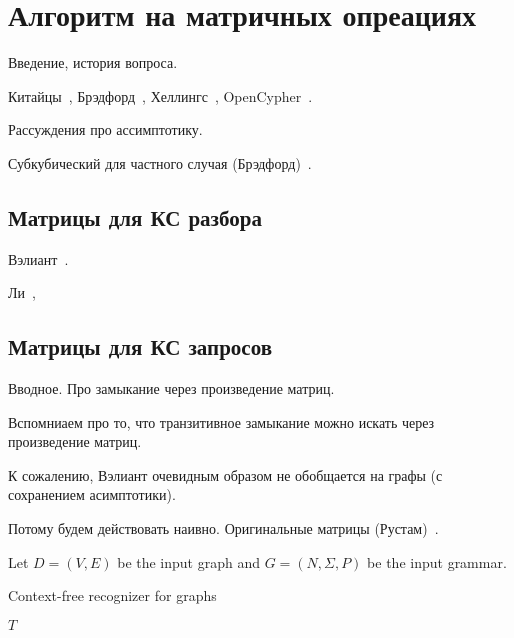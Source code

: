 \section{Алгоритм на матричных опреациях}

Введение, история вопроса.

Китайцы~\cite{10.1007/978-3-319-46523-4_38}, Брэдфорд~\cite{bradford2007quickest,ward2008distributed,bradford2016fast,Bradford:2008:LCG:1373936.1373946}, Хеллингс~\cite{hellingsRelational,hellings2015querying,Hellings2015PathRF}, OpenCypher~\cite{Kuijpers:2019:ESC:3335783.3335791}.

Рассуждения про ассимптотику.

Субкубический для частного случая (Брэдфорд)~\cite{8249039}.

\subsection{Матрицы для КС разбора}

Вэлиант~\cite{Valiant:1975:GCR:1739932.1740048}.

Ли~\cite{Lee:2002:FCG:505241.505242},


\subsection{Матрицы для КС запросов}
Вводное.
Про замыкание через произведение матриц.

Вспомниаем про то, что транзитивное замыкание можно искать через произведение матриц.


К сожалению, Вэлиант очевидным образом не обобщается на графы (с сохранением асимптотики).


Потому будем действовать наивно.
Оригинальные матрицы (Рустам)~\cite{Azimov:2018:CPQ:3210259.3210264}.

Let $D = (V, E)$ be the input graph and $G = (N,\Sigma,P)$ be the input grammar.

\begin{algorithm}[H]
\begin{algorithmic}[1]
\caption{Context-free recognizer for graphs}
\label{alg:graphParse}
    
    \EndFor    
       
    \EndWhile
\State \Return $T$
\EndFunction
\end{algorithmic}
\end{algorithm}


